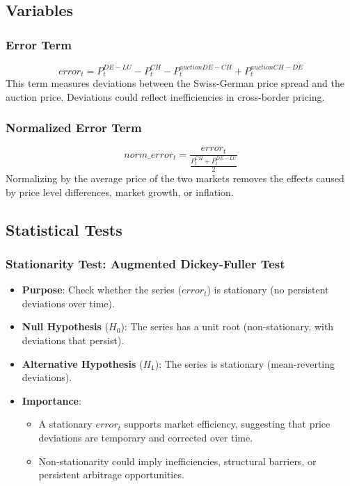 \documentclass[12pt]{article}
\begin{document}
\subsection{Variables} 

\subsubsection {Error Term}
   $$
   error_t = P_t^{DE-LU} - P_t^{CH} - P_t^{auction DE-CH} + P_t^{auction CH-DE}
   $$
   This term measures deviations between the Swiss-German price spread and the auction price. Deviations could reflect inefficiencies in cross-border pricing.

\subsubsection {Normalized Error Term}
   $$
   norm\_error_t = \frac{error_t}{\frac{P_t^{CH} + P_t^{DE-LU}}{2}}
   $$
   Normalizing by the average price of the two markets removes the effects caused by price level differences, market growth, or inflation.

\subsection {Statistical Tests}
\subsubsection {Stationarity Test: Augmented Dickey-Fuller Test}

\begin{itemize}
    \item \textbf{Purpose}: Check whether the series ($error_t$) is stationary (no persistent deviations over time).
    \item \textbf{Null Hypothesis} ($H_0$): The series has a unit root (non-stationary, with deviations that persist).
    \item \textbf{Alternative Hypothesis} ($H_1$): The series is stationary (mean-reverting deviations).
    \item \textbf{Importance}:
    \begin{itemize}
        \item A stationary $error_t$ supports market efficiency, suggesting that price deviations are temporary and corrected over time.
        \item Non-stationarity could imply inefficiencies, structural barriers, or persistent arbitrage opportunities.
    \end{itemize}
\end{itemize}
\end{document}
